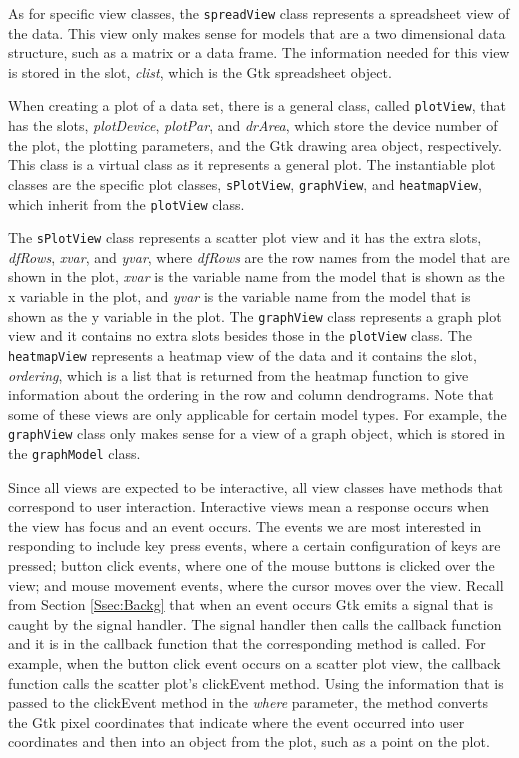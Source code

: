 \documentclass{article}[11pt]
\newcommand{\Rfunction}[1]{{\textsf{#1}}}
\newcommand{\Rslot}[1]{\textsl{#1}}
\newcommand{\Rclass}[1]{\texttt{#1}}
\begin{document}
As for specific view classes, the \Rclass{spreadView} class
represents a spreadsheet view of the data.  This view only makes sense for
models that are a two dimensional data structure, such as a matrix or a data
frame.  The information needed for this view is stored in the slot,
\Rslot{clist}, which is the Gtk spreadsheet object.

When creating a plot of a data set, there is a general class, called
\Rclass{plotView}, that has the slots, \Rslot{plotDevice}, \Rslot{plotPar},
and \Rslot{drArea}, which store the device number of the plot, the plotting
parameters, and the Gtk drawing area object, respectively.  This class is a
virtual class as it represents a general plot.  The instantiable plot classes
are the specific plot classes, \Rclass{sPlotView}, \Rclass{graphView}, and
\Rclass{heatmapView}, which inherit from the \Rclass{plotView} class.  

The \Rclass{sPlotView} class represents a scatter plot view and it has the
extra slots, \Rslot{dfRows}, \Rslot{xvar}, and \Rslot{yvar}, where
\Rslot{dfRows} are the row names from the model that are shown in the plot,
\Rslot{xvar} is the variable name from the model that is shown as the x
variable in the plot, and \Rslot{yvar} is the variable name from the model
that is shown as the y variable in the plot.  The \Rclass{graphView} class
represents a graph plot view and it contains no extra slots besides those in
the \Rclass{plotView} class.  The \Rclass{heatmapView} represents a heatmap
view of the data and it contains the slot, \Rslot{ordering}, which is a list
that is returned from the \Rfunction{heatmap} function to give information
about the ordering in the row and column dendrograms.  Note that some of these
views are only applicable for certain model types.  For example, the
\Rclass{graphView} class only makes sense for a view of a graph object,
which is stored in the \Rclass{graphModel} class. 

Since all views are expected to be interactive, all view classes have methods
that correspond to user interaction.  Interactive views mean a response
occurs when the view has focus and an event occurs.  The events we are most
interested in responding to include key press
events, where a certain configuration of keys are pressed; button click
events, where one of the mouse buttons is clicked over the view; and mouse
movement events, where the cursor moves over the view.  Recall from Section
\ref{Ssec:Backg} that when an event occurs Gtk emits a signal that is caught
by the signal handler.  The signal handler then calls the callback function
and it is in the callback function that the corresponding method is called.
For example, when the button click event occurs on a scatter plot view, the
callback function calls the scatter plot's \Rfunction{clickEvent} method.
Using the information that is passed to the \Rfunction{clickEvent} method in
the \Rslot{where} parameter, the method converts the Gtk pixel coordinates
that indicate where the event occurred into user coordinates and then into an
object from the plot, such as a point on the plot. 
\end{document}
